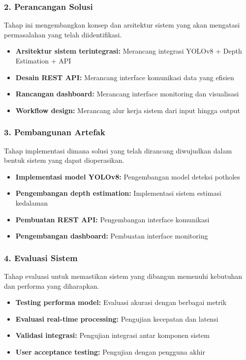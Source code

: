 \documentclass[12pt,a4paper]{report}
\begin{document}
\subsubsection{2. Perancangan Solusi}

Tahap ini mengembangkan konsep dan arsitektur sistem yang akan mengatasi permasalahan yang telah diidentifikasi.

\begin{itemize}
    \item \textbf{Arsitektur sistem terintegrasi:} Merancang integrasi YOLOv8 + Depth Estimation + API
    \item \textbf{Desain REST API:} Merancang interface komunikasi data yang efisien
    \item \textbf{Rancangan dashboard:} Merancang interface monitoring dan visualisasi
    \item \textbf{Workflow design:} Merancang alur kerja sistem dari input hingga output
\end{itemize}

\subsubsection{3. Pembangunan Artefak}

Tahap implementasi dimana solusi yang telah dirancang diwujudkan dalam bentuk sistem yang dapat dioperasikan.

\begin{itemize}
    \item \textbf{Implementasi model YOLOv8:} Pengembangan model deteksi potholes
    \item \textbf{Pengembangan depth estimation:} Implementasi sistem estimasi kedalaman
    \item \textbf{Pembuatan REST API:} Pengembangan interface komunikasi
    \item \textbf{Pengembangan dashboard:} Pembuatan interface monitoring
\end{itemize}

\subsubsection{4. Evaluasi Sistem}

Tahap evaluasi untuk memastikan sistem yang dibangun memenuhi kebutuhan dan performa yang diharapkan.

\begin{itemize}
    \item \textbf{Testing performa model:} Evaluasi akurasi dengan berbagai metrik
    \item \textbf{Evaluasi real-time processing:} Pengujian kecepatan dan latensi
    \item \textbf{Validasi integrasi:} Pengujian integrasi antar komponen sistem
    \item \textbf{User acceptance testing:} Pengujian dengan pengguna akhir
\end{itemize}
\end{document}
